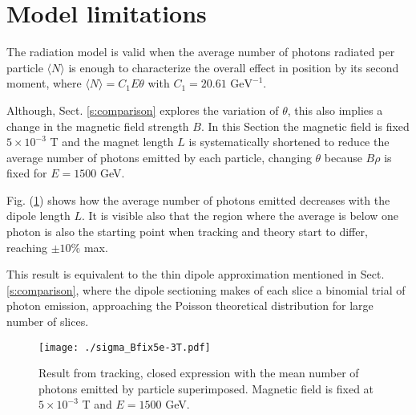 \section{Model limitations}\label{s:modellim}
The radiation model is valid when the average number of photons radiated per particle $\langle N\rangle$ is enough to characterize the overall effect in position by its second moment, where $\langle N\rangle  = C_1E\theta$ with $C_1=20.61\text{ GeV}^{-1}$.\par
Although, Sect. \ref{s:comparison} explores the variation of $\theta$, this also implies a change in the magnetic field strength $B$. In this Section the magnetic field is fixed $5 \times 10^{-3}$ T and the magnet length $L$ is systematically shortened to reduce the average number of photons emitted by each particle, changing $\theta$ because $B\rho$ is fixed for $E=1500$ GeV.\par
Fig. (\ref{figPhotons}) shows how the average number of photons emitted decreases with the dipole length $L$. It is visible also that the region where the average is below one photon is also the starting point when tracking and theory start to differ, reaching $\pm10\%$ max.\par
This result is equivalent to the thin dipole approximation mentioned in Sect. \ref{s:comparison}, where the dipole sectioning makes of each slice a binomial trial of photon emission, approaching the Poisson theoretical distribution for large number of slices.\par
\begin{figure}[htb]
\centering
\texttt{[image: ./sigma\_Bfix5e-3T.pdf]} \caption{Result from tracking, closed expression with the mean number of photons emitted by particle superimposed. Magnetic field is fixed at $5\times 10^{-3}$ T and $E=1500$  GeV.}\label{figPhotons}
\end{figure}

